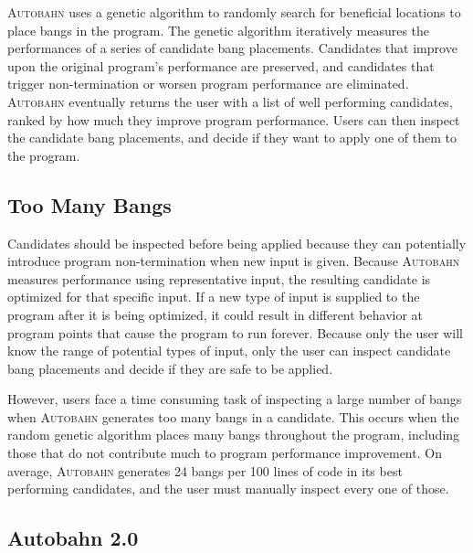 \documentclass[format=sigplan]{acmart}
\begin{document}
\textsc{Autobahn} uses a genetic algorithm to randomly search for beneficial locations to place bangs in the program. The genetic algorithm iteratively measures the performances of a series of candidate bang placements. Candidates that improve upon the original program's performance are preserved, and candidates that trigger non-termination or worsen program performance are eliminated. \textsc{Autobahn} eventually returns the user with a list of well performing candidates, ranked by how much they improve program performance. Users can then inspect the candidate bang placements, and decide if they want to apply one of them to the program.

\subsection{Too Many Bangs}

Candidates should be inspected before being applied because they can potentially introduce program non-termination when new input is given. Because \textsc{Autobahn} measures performance using representative input, the resulting candidate is optimized for that specific input. If a new type of input is supplied to the program after it is being optimized, it could result in different behavior at program points that cause the program to run forever. Because only the user will know the range of potential types of input, only the user can inspect candidate bang placements and decide if they are safe to be applied.

However, users face a time consuming task of inspecting a large number of bangs when \textsc{Autobahn} generates too many bangs in a candidate. This occurs when the random genetic algorithm places many bangs throughout the program, including those that do not contribute much to program performance improvement. On average, \textsc{Autobahn} generates 24 bangs per 100 lines of code in its best performing candidates, and the user must manually inspect every one of those.   

\subsection{Autobahn 2.0}
\end{document}
